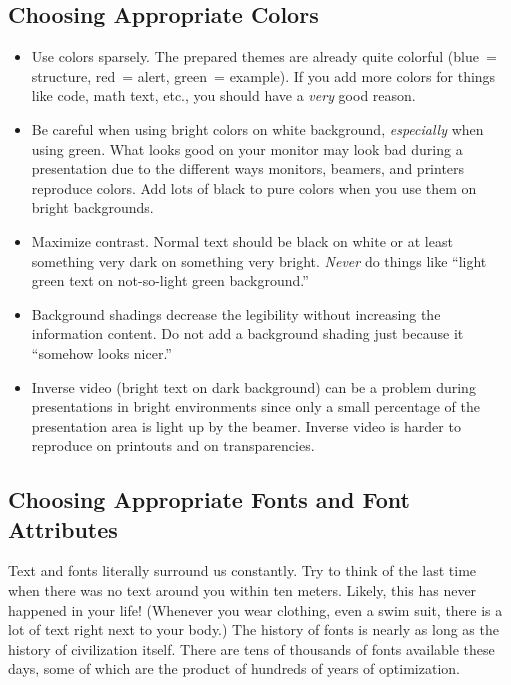 \subsection{Choosing Appropriate Colors}

\begin{itemize}
\item
  Use colors sparsely. The prepared themes are already quite
  colorful (blue~= structure, red~= alert, green~= example). If you
  add more colors for things like code, math text, etc., you should
  have a \emph{very} good reason. 
\item
  Be careful when using bright colors on white background,
  \emph{especially} when using green. What looks good on your monitor
  may look bad during a presentation due to the different ways
  monitors, beamers, and printers reproduce colors. Add lots of black
  to pure colors when you use them on bright backgrounds.
\item
  Maximize contrast. Normal text should be black on white or at least
  something very dark on something very bright. \emph{Never} do things
  like ``light green text on not-so-light green background.''
\item
  Background shadings decrease the legibility without increasing the
  information content. Do not add a background shading just because it
  ``somehow looks nicer.'' 
\item
  Inverse video (bright text on dark background) can be a problem
  during presentations in bright environments since only a small
  percentage of the presentation area is light up by the
  beamer. Inverse video is harder to reproduce on printouts and on
  transparencies. 
\end{itemize}






\subsection{Choosing Appropriate Fonts and Font Attributes}

Text and fonts literally surround us constantly. Try to think of the
last time when  there was no text around you within ten
meters. Likely, this has never happened in your life! 
(Whenever you wear clothing, even a swim suit, there is a lot of text
right next to your body.) The history of fonts is nearly as long as
the history of civilization itself. There are tens of thousands of fonts
available these days, some of which are the product of hundreds of
years of optimization.


